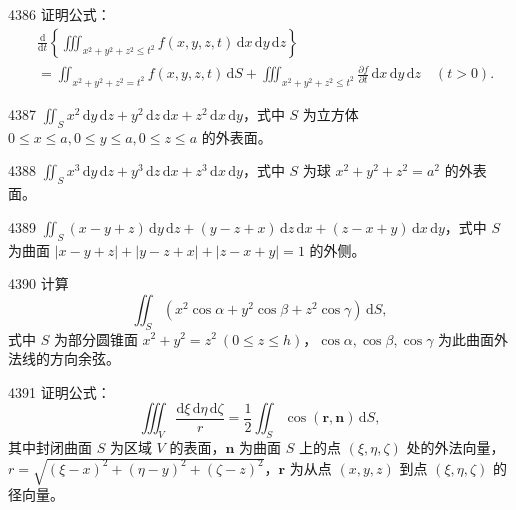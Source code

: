 \begin{prob}[M]{4386}
证明公式：
\[\begin{aligned}
&\frac{\mathrm{d}}{\mathrm{d}t}\left\{\iiint_{x^{2}+y^{2}+z^{2}\leqslant t^{2}} f(x,y,z,t)\,\mathrm{d}x\,\mathrm{d}y\,\mathrm{d}z\right\} \\
&= \iint_{x^{2}+y^{2}+z^{2}=t^{2}} f(x,y,z,t)\,\mathrm{d}S + \iiint_{x^{2}+y^{2}+z^{2}\leqslant t^{2}} \frac{\partial f}{\partial t}\,\mathrm{d}x\,\mathrm{d}y\,\mathrm{d}z \quad (t > 0).
\end{aligned}\]
\end{prob}


\begin{prob}[S]{4387}
$\displaystyle \iint_{S} x^{2}\,\mathrm{d}y\,\mathrm{d}z + y^{2}\,\mathrm{d}z\,\mathrm{d}x + z^{2}\,\mathrm{d}x\,\mathrm{d}y$，式中 $S$ 为立方体 $0 \leqslant x \leqslant a, 0 \leqslant y \leqslant a, 0 \leqslant z \leqslant a$ 的外表面。
\end{prob}

\begin{prob}[S]{4388}
$\displaystyle \iint_{S} x^{3}\,\mathrm{d}y\,\mathrm{d}z + y^{3}\,\mathrm{d}z\,\mathrm{d}x + z^{3}\,\mathrm{d}x\,\mathrm{d}y$，式中 $S$ 为球 $x^{2}+y^{2}+z^{2}=a^{2}$ 的外表面。
\end{prob}

\begin{prob}[M]{4389}
$\displaystyle \iint_{S} (x-y+z)\,\mathrm{d}y\,\mathrm{d}z + (y-z+x)\,\mathrm{d}z\,\mathrm{d}x + (z-x+y)\,\mathrm{d}x\,\mathrm{d}y$，式中 $S$ 为曲面 $|x-y+z| + |y-z+x| + |z-x+y| = 1$ 的外侧。
\end{prob}

\begin{prob}[M]{4390}
计算
\[\iint_{S} (x^{2}\cos\alpha + y^{2}\cos\beta + z^{2}\cos\gamma)\,\mathrm{d}S,\]
式中 $S$ 为部分圆锥面 $x^{2}+y^{2}=z^{2}\ (0 \leqslant z \leqslant h)$，$\cos\alpha, \cos\beta, \cos\gamma$ 为此曲面外法线的方向余弦。
\end{prob}

\begin{prob}[M]{4391}
证明公式：
\[\iiint_{V} \frac{\mathrm{d}\xi\,\mathrm{d}\eta\,\mathrm{d}\zeta}{r} = \frac{1}{2} \iint_{S} \cos(\boldsymbol{r}, \boldsymbol{n})\,\mathrm{d}S,\]
其中封闭曲面 $S$ 为区域 $V$ 的表面，$\boldsymbol{n}$ 为曲面 $S$ 上的点 $(\xi, \eta, \zeta)$ 处的外法向量，$r = \sqrt{(\xi-x)^{2}+(\eta-y)^{2}+(\zeta-z)^{2}}$，$\boldsymbol{r}$ 为从点 $(x,y,z)$ 到点 $(\xi, \eta, \zeta)$ 的径向量。
\end{prob}

